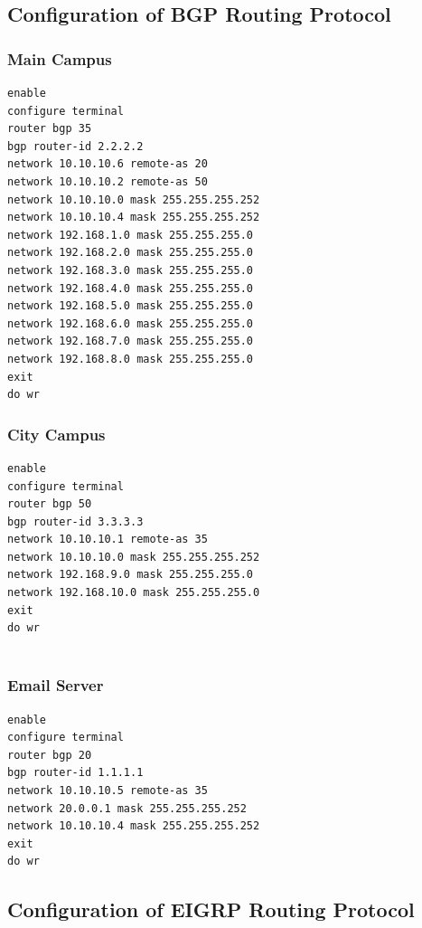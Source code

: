 \documentclass[12pt]{article}
\begin{document}
\subsection{Configuration of BGP Routing Protocol}
\subsubsection{Main Campus}
\begin{verbatim}
enable
configure terminal
router bgp 35
bgp router-id 2.2.2.2
network 10.10.10.6 remote-as 20
network 10.10.10.2 remote-as 50
network 10.10.10.0 mask 255.255.255.252
network 10.10.10.4 mask 255.255.255.252
network 192.168.1.0 mask 255.255.255.0
network 192.168.2.0 mask 255.255.255.0
network 192.168.3.0 mask 255.255.255.0
network 192.168.4.0 mask 255.255.255.0
network 192.168.5.0 mask 255.255.255.0
network 192.168.6.0 mask 255.255.255.0
network 192.168.7.0 mask 255.255.255.0
network 192.168.8.0 mask 255.255.255.0
exit
do wr
\end{verbatim}

\subsubsection{City Campus}
\begin{verbatim}
enable
configure terminal
router bgp 50
bgp router-id 3.3.3.3
network 10.10.10.1 remote-as 35
network 10.10.10.0 mask 255.255.255.252
network 192.168.9.0 mask 255.255.255.0
network 192.168.10.0 mask 255.255.255.0
exit
do wr


\end{verbatim}

\subsubsection{Email Server}
\begin{verbatim}
enable
configure terminal
router bgp 20
bgp router-id 1.1.1.1
network 10.10.10.5 remote-as 35
network 20.0.0.1 mask 255.255.255.252
network 10.10.10.4 mask 255.255.255.252
exit
do wr

\end{verbatim}

















\subsection{Configuration of EIGRP Routing Protocol}
\end{document}
